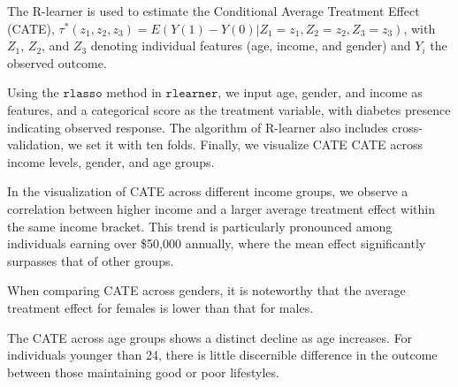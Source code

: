 \documentclass[
  12pt,
]{article}
\begin{document}
The R-learner is used to estimate the Conditional Average Treatment
Effect (CATE),
\(\tau^*(z_1,z_2,z_3) = E(Y(1)-Y(0)|Z_1=z_1,Z_2 = z_2,Z_3 = z_3)\), with
\(Z_1\), \(Z_2\), and \(Z_3\) denoting individual features (age, income,
and gender) and \(Y_i\) the observed outcome.

Using the \(\texttt{rlasso}\) method in \(\texttt{rlearner}\), we input
age, gender, and income as features, and a categorical score as the
treatment variable, with diabetes presence indicating observed response.
The algorithm of R-learner also includes cross-validation, we set it
with ten folds. Finally, we visualize CATE CATE across income levels,
gender, and age groups.

In the visualization of CATE across different income groups, we observe
a correlation between higher income and a larger average treatment
effect within the same income bracket. This trend is particularly
pronounced among individuals earning over \$50,000 annually, where the
mean effect significantly surpasses that of other groups.

When comparing CATE across genders, it is noteworthy that the average
treatment effect for females is lower than that for males.

The CATE across age groups shows a distinct decline as age increases.
For individuals younger than 24, there is little discernible difference
in the outcome between those maintaining good or poor lifestyles.
\end{document}
